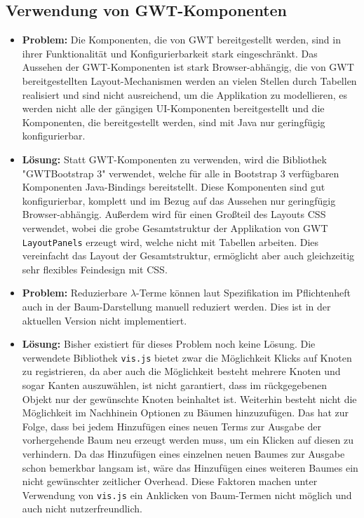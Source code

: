 \documentclass[parskip=full,11pt]{scrartcl}
\begin{document}
\subsection{Verwendung von GWT-Komponenten}
\begin{itemize}

\item[] \textbf{Problem:}
Die Komponenten, die von GWT bereitgestellt werden, sind in ihrer Funktionalität und Konfigurierbarkeit stark eingeschränkt.
Das Aussehen der GWT-Kom\-po\-nen\-ten ist stark Browser-abhängig, die von GWT bereitgestellten Layout-Mechanismen werden an vielen Stellen durch Tabellen realisiert und sind nicht ausreichend, um die Applikation zu modellieren, es werden nicht alle der gängigen UI-Komponenten bereitgestellt und die Komponenten, die bereitgestellt werden, sind mit Java nur geringfügig konfigurierbar.
\item[] \textbf{Lösung:}
Statt GWT-Komponenten zu verwenden, wird die Bibliothek "GWTBootstrap 3" verwendet, welche für alle in Bootstrap 3 verfügbaren Komponenten Java-Bindings bereitstellt. Diese Komponenten sind gut konfigurierbar, komplett und im Bezug auf das Aussehen nur geringfügig Browser-abhängig. Außerdem wird für einen Großteil des Layouts CSS verwendet, wobei die grobe Gesamtstruktur der Applikation von GWT \texttt{LayoutPanels} erzeugt wird, welche nicht mit Tabellen arbeiten. Dies vereinfacht das Layout der Gesamtstruktur, ermöglicht aber auch gleichzeitig sehr flexibles Feindesign mit CSS.

\item[] \textbf{Problem:} Reduzierbare $\lambda$-Terme können laut Spezifikation im Pflichtenheft auch in der Baum-Darstellung manuell reduziert werden. Dies ist in der aktuellen Version nicht implementiert.
\item[] \textbf{Lösung:} Bisher existiert für dieses Problem noch keine Lösung. Die verwendete Bibliothek \texttt{vis.js} bietet zwar die Möglichkeit Klicks auf Knoten zu registrieren, da aber auch die Möglichkeit besteht mehrere Knoten und sogar Kanten auszuwählen, ist nicht garantiert, dass im rückgegebenen Objekt nur der gewünschte Knoten beinhaltet ist. Weiterhin besteht nicht die Möglichkeit im Nachhinein Optionen zu Bäumen hinzuzufügen. Das hat zur Folge, dass bei jedem Hinzufügen eines neuen Terms zur Ausgabe der vorhergehende Baum neu erzeugt werden muss, um ein Klicken auf diesen zu verhindern. Da das Hinzufügen eines einzelnen neuen Baumes zur Ausgabe schon bemerkbar langsam ist, wäre das Hinzufügen eines weiteren Baumes ein nicht gewünschter zeitlicher Overhead.
Diese Faktoren machen unter Verwendung von \texttt{vis.js} ein Anklicken von Baum-Termen nicht möglich und auch nicht nutzerfreundlich. 


\end{itemize}
\end{document}
